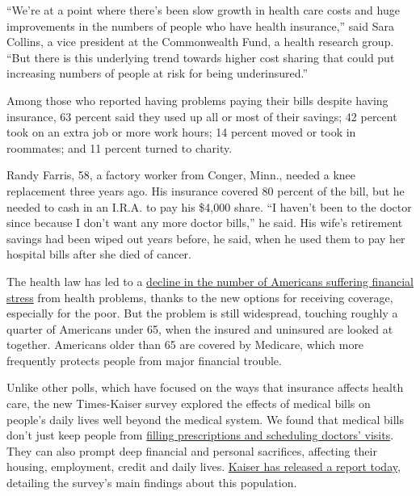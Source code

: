 ``We're at a point where there's been slow growth in health care costs
and huge improvements in the numbers of people who have health
insurance,'' said Sara Collins, a vice president at the Commonwealth
Fund, a health research group. ``But there is this underlying trend
towards higher cost sharing that could put increasing numbers of people
at risk for being underinsured.''

Among those who reported having problems paying their bills despite
having insurance, 63 percent said they used up all or most of their
savings; 42 percent took on an extra job or more work hours; 14 percent
moved or took in roommates; and 11 percent turned to charity.

Randy Farris, 58, a factory worker from Conger, Minn., needed a knee
replacement three years ago. His insurance covered 80 percent of the
bill, but he needed to cash in an I.R.A. to pay his \$4,000 share. ``I
haven't been to the doctor since because I don't want any more doctor
bills,'' he said. His wife's retirement savings had been wiped out years
before, he said, when he used them to pay her hospital bills after she
died of cancer.

The health law has led to a
\href{http://www.cdc.gov/nchs/data/nhis/earlyrelease/probs_paying_medical_bills_jan_2011_jun_2014.pdf}{decline
in the number of Americans suffering financial stress} from health
problems, thanks to the new options for receiving coverage, especially
for the poor. But the problem is still widespread, touching roughly a
quarter of Americans under 65, when the insured and uninsured are looked
at together. Americans older than 65 are covered by Medicare, which more
frequently protects people from major financial trouble.

Unlike other polls, which have focused on the ways that insurance
affects health care, the new Times-Kaiser survey explored the effects of
medical bills on people's daily lives well beyond the medical system. We
found that medical bills don't just keep people from
\href{http://www.gallup.com/poll/187190/cost-delays-healthcare-one-three.aspx?g_source=CATEGORY_WELLBEING\&g_medium=topic\&g_campaign=tiles}{filling
prescriptions and scheduling doctors' visits}. They can also prompt deep
financial and personal sacrifices, affecting their housing, employment,
credit and daily lives.
\href{http://kff.org/health-costs/report/the-burden-of-medical-debt-results-from-the-kaiser-family-foundationnew-york-times-medical-bills-survey}{Kaiser
has released a report today}, detailing the survey's main findings about
this population.

